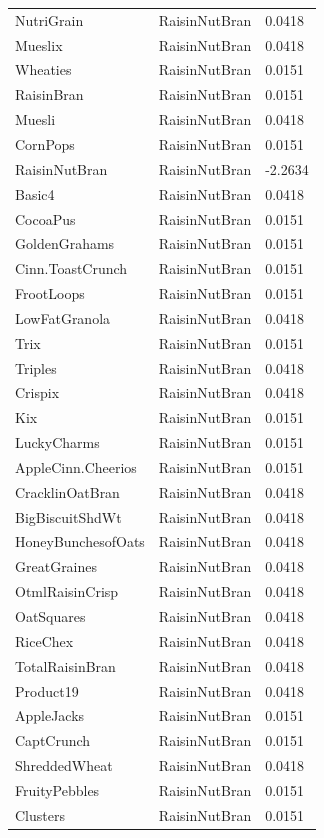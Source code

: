 \begin{table}[!htbp]
\begin{tabular}{lll}
\\
NutriGrain & RaisinNutBran & 0.0418
\\
Mueslix & RaisinNutBran & 0.0418
\\
Wheaties & RaisinNutBran & 0.0151
\\
RaisinBran & RaisinNutBran & 0.0151
\\
Muesli & RaisinNutBran & 0.0418
\\
CornPops & RaisinNutBran & 0.0151
\\
RaisinNutBran & RaisinNutBran & -2.2634
\\
Basic4 & RaisinNutBran & 0.0418
\\
CocoaPus & RaisinNutBran & 0.0151
\\
GoldenGrahams & RaisinNutBran & 0.0151
\\
Cinn.ToastCrunch & RaisinNutBran & 0.0151
\\
FrootLoops & RaisinNutBran & 0.0151
\\
LowFatGranola & RaisinNutBran & 0.0418
\\
Trix & RaisinNutBran & 0.0151
\\
Triples & RaisinNutBran & 0.0418
\\
Crispix & RaisinNutBran & 0.0418
\\
Kix & RaisinNutBran & 0.0151
\\
LuckyCharms & RaisinNutBran & 0.0151
\\
AppleCinn.Cheerios & RaisinNutBran & 0.0151
\\
CracklinOatBran & RaisinNutBran & 0.0418
\\
BigBiscuitShdWt & RaisinNutBran & 0.0418
\\
HoneyBunchesofOats & RaisinNutBran & 0.0418
\\
GreatGraines & RaisinNutBran & 0.0418
\\
OtmlRaisinCrisp & RaisinNutBran & 0.0418
\\
OatSquares & RaisinNutBran & 0.0418
\\
RiceChex & RaisinNutBran & 0.0418
\\
TotalRaisinBran & RaisinNutBran & 0.0418
\\
Product19 & RaisinNutBran & 0.0418
\\
AppleJacks & RaisinNutBran & 0.0151
\\
CaptCrunch & RaisinNutBran & 0.0151
\\
ShreddedWheat & RaisinNutBran & 0.0418
\\
FruityPebbles & RaisinNutBran & 0.0151
\\
Clusters & RaisinNutBran & 0.0151

\end{tabular}
\end{table}
